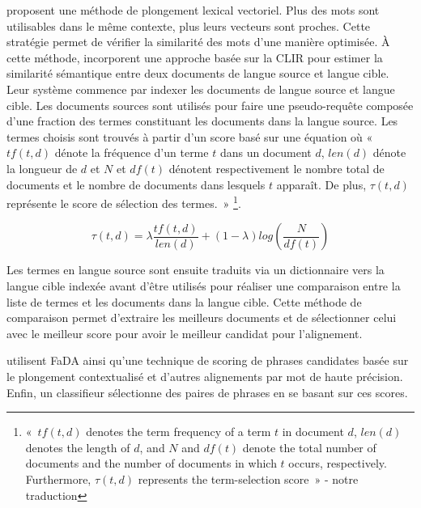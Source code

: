 \citet{lohar_2016} proposent une méthode de plongement lexical vectoriel.
Plus des mots sont utilisables dans le même contexte, plus leurs vecteurs sont proches. Cette stratégie permet
de vérifier la similarité des mots d'une manière optimisée.
À cette méthode, \citet{lohar_2016} incorporent une approche basée sur la
CLIR pour estimer la similarité sémantique entre deux documents de langue source et langue cible. Leur système
commence par indexer les documents de langue source et langue cible. Les documents sources sont utilisés pour
faire une pseudo-requête composée d'une fraction des termes constituant les documents dans la langue source.
Les termes choisis sont trouvés à partir d'un score basé sur une équation où «~$tf(t,d)$ dénote la fréquence
d'un terme $t$ dans un document $d$, $len(d)$ dénote la longueur de $d$ et $N$ et $df(t)$ dénotent respectivement
le nombre total de documents et le nombre de documents dans lesquels $t$ apparaît. De plus, $\tau(t,d)$
représente le score de sélection des termes.~» \citep{lohar_2016}\footnote{«~$tf(t, d)$ denotes the term frequency of a
term $t$ in document $d$, $len(d)$ denotes the length of $d$, and $N$ and $df(t)$ denote the total number of documents and the
number of documents in which $t$ occurs, respectively. Furthermore, $\tau(t, d)$ represents the term-selection score~» - notre traduction}.

\[ \tau(t,d)=\lambda\frac{tf(t,d)}{len(d)}+(1-\lambda)log(\frac{N}{df(t)}) \]

Les termes en langue source sont ensuite traduits via un dictionnaire vers la langue cible indexée avant
d'être utilisés pour réaliser une comparaison entre la liste de termes et les documents dans la langue cible.
Cette méthode de comparaison permet d'extraire les meilleurs documents et de sélectionner celui avec le
meilleur score pour avoir le meilleur candidat pour l'alignement.

\citet{steingrimsson_2021} utilisent FaDA ainsi qu'une technique de scoring de phrases candidates basée sur
le plongement contextualisé et d'autres alignements par mot de haute précision. Enfin, un classifieur
sélectionne des paires de phrases en se basant sur ces scores.

